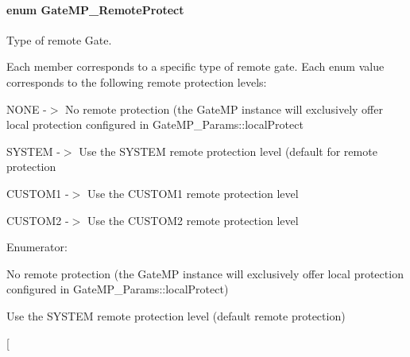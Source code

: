 \paragraph[{GateMP\_\-RemoteProtect}]{\setlength{\rightskip}{0pt plus 5cm}enum {\bf GateMP\_\-RemoteProtect}}\hfill\label{_gate_m_p_8h_a88716d5706d8fa8c6a3b9a4f023ef1d8}


Type of remote Gate. 

Each member corresponds to a specific type of remote gate. Each enum value corresponds to the following remote protection levels:
\begin{DoxyItemize}
\item NONE -\/$>$ No remote protection (the GateMP instance will exclusively offer local protection configured in GateMP\_\-Params::localProtect
\item SYSTEM -\/$>$ Use the SYSTEM remote protection level (default for remote protection
\item CUSTOM1 -\/$>$ Use the CUSTOM1 remote protection level
\item CUSTOM2 -\/$>$ Use the CUSTOM2 remote protection level 
\end{DoxyItemize}\begin{Desc}
\item[Enumerator: ]\par
\begin{description}
\item[{\em 
GateMP\_\-RemoteProtect\_\-NONE\label{_gate_m_p_8h_a88716d5706d8fa8c6a3b9a4f023ef1d8a29b87b5258dbf5e387fc5a4ada3548ab}
}]No remote protection (the GateMP instance will exclusively offer local protection configured in GateMP\_\-Params::localProtect) \item[{\em 
GateMP\_\-RemoteProtect\_\-SYSTEM\label{_gate_m_p_8h_a88716d5706d8fa8c6a3b9a4f023ef1d8aba4e153ee33cce1d32dc84254261c557}
}]Use the SYSTEM remote protection level (default remote protection) \item[{\em 
}
\end{description}
\end{Desc}
